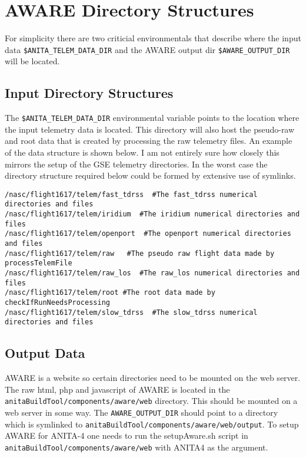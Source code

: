 \documentclass{article}
\begin{document}
\section{AWARE Directory Structures}
For simplicity there are two criticial environmentals that describe where the input data {\tt \$ANITA\_TELEM\_DATA\_DIR} and the AWARE output dir {\tt \$AWARE\_OUTPUT\_DIR} will be located.

\subsection{Input Directory Structures}
The {\tt \$ANITA\_TELEM\_DATA\_DIR} environmental variable points to the location where the input telemetry data is located. This directory will also host the pseudo-raw and root data that is created by processing the raw telemetry files. An example of the data structure is shown below. I am not entirely sure how closely this mirrors the setup of the GSE telemetry directories. In the worst case the directory structure required below could be formed by extensive use of symlinks.

\begin{verbatim}
/nasc/flight1617/telem/fast_tdrss  #The fast_tdrss numerical directories and files
/nasc/flight1617/telem/iridium  #The iridium numerical directories and files
/nasc/flight1617/telem/openport  #The openport numerical directories and files
/nasc/flight1617/telem/raw   #The pseudo raw flight data made by processTelemFile
/nasc/flight1617/telem/raw_los  #The raw_los numerical directories and files
/nasc/flight1617/telem/root #The root data made by checkIfRunNeedsProcessing
/nasc/flight1617/telem/slow_tdrss  #The slow_tdrss numerical directories and files
\end{verbatim}

\subsection{Output Data}
AWARE is a website so certain directories need to be mounted on the web server. The raw html, php and javascript of AWARE is located in the {\tt anitaBuildTool/components/aware/web} directory. This should be mounted on a web server in some way. The {\tt AWARE\_OUTPUT\_DIR} should point to a directory which is symlinked to {\tt anitaBuildTool/components/aware/web/output}. To setup AWARE for ANITA-4 one needs to run the setupAware.sh script in {\tt anitaBuildTool/components/aware/web} with ANITA4 as the argument.
\end{document}
